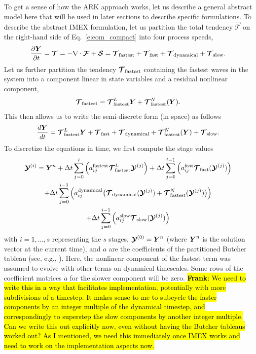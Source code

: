 \documentclass{article}
\begin{document}
To get a sense of how the ARK approach works, let us describe a general abstract model here that will be used in later sections to describe specific formulations. To describe the abstract IMEX formulation, let us partition the total tendency $\vec{\mathcal{T}}$ on the right-hand side of Eq.~\eqref{e:eom_compact} into four process speeds,
\[
\frac{\partial \boldsymbol{{Y}}}{\partial t} = \boldsymbol{{\mathcal{T}}} = - \nabla \cdot \boldsymbol{{\mathcal{F}}} + \boldsymbol{{\mathcal{S}}} = \boldsymbol{{\mathcal{T}}}_{\mathrm{fastest}} + \boldsymbol{{\mathcal{T}}}_{\mathrm{fast}} + \boldsymbol{{\mathcal{T}}}_{\mathrm{dynamical}} + \boldsymbol{{\mathcal{T}}}_{\mathrm{slow}}.
\]
Let us further partition the tendency $\boldsymbol{{\mathcal{T}}}_\mathrm{fastest}$ containing the fastest waves in the system into a component linear in state variables and a residual nonlinear component,
\[
\boldsymbol{{\mathcal{T}}}_\mathrm{fastest} =  \boldsymbol{{\mathcal{T}}}^L_\mathrm{fastest} \boldsymbol{{Y}} + \boldsymbol{{\mathcal{T}}}^N_\mathrm{fastest}(\boldsymbol{{Y}}).
\]
This then allows us to write the semi-discrete form (in space) as follows
\begin{equation}\label{eq:IMEX}
\frac{d \boldsymbol{{Y}}}{d t} =  \boldsymbol{{\mathcal{T}}}^L_\mathrm{fastest} \boldsymbol{{Y}} + \boldsymbol{{\mathcal{T}}}_\mathrm{fast} + 
\boldsymbol{{\mathcal{T}}}_\mathrm{dynamical} + \boldsymbol{{\mathcal{T}}}^N_\mathrm{fastest}(\boldsymbol{{Y}}) + \boldsymbol{{\mathcal{T}}}_\mathrm{slow}.
\end{equation}
To discretize the equations in time, we first compute the stage values
\begin{multline}\label{eq:IMEX/stages}
\boldsymbol{{\mathcal{Y}}}^{(i)}= \boldsymbol{{Y}}^n + \Delta t \sum_{j=0}^{i} \left( a^{\mathrm{fastest}}_{ij} \boldsymbol{{\mathcal{T}}}_{\mathrm{fastest}}^L \boldsymbol{{\mathcal{Y}}}^{(j)} \right) + \Delta t \sum_{j=0}^{i-1} \left( {a}^{\mathrm{fast}}_{ij} \boldsymbol{{\mathcal{T}}}_{\mathrm{fast}}(\boldsymbol{{\mathcal{Y}}}^{(j)}) \right)  \\
+  \Delta t \sum_{j=0}^{i-1} \left( {a}^{\mathrm{dynamical}}_{ij} \bigl(\boldsymbol{{\mathcal{T}}}_{\mathrm{dynamical}}(\boldsymbol{{\mathcal{Y}}}^{(j)}) + \boldsymbol{{\mathcal{T}}}^N_\mathrm{fastest}(\boldsymbol{{\mathcal{Y}}}^{(j)})\bigr)\right) \\
+ \Delta t \sum_{j=0}^{i-1} \left( {a}^{\mathrm{slow}}_{ij} \boldsymbol{{\mathcal{T}}}_{\mathrm{slow}}(\boldsymbol{{\mathcal{Y}}}^{(j)}) \right)
\end{multline}
with $i=1,\ldots,s$ representing the $s$ stages, $\boldsymbol{{\mathcal{Y}}}^{(0)}=\boldsymbol{{Y}}^n$ (where $\boldsymbol{{Y}}^n$ is the solution vector at the current time), and $a$ are the coefficients of the partitioned Butcher tableau (see, e.g., \citet{constantinescu:2007, constantinescu:2007}). Here, the nonlinear component of the fastest term was assumed to evolve with other terms on dynamical timescales. Some rows of the coefficient matrices $a$ for the slower component will be zero. \hl{\textbf{Frank}: We need to write this in a way that facilitates implementation, potentially with more subdivisions of a timestep. It makes sense to me to subcycle the faster components by an integer multiple of the dynamical timestep, and correspondingly to superstep the slow components by another integer multiple. Can we write this out explicitly now, even without having the Butcher tableaus worked out? As I mentioned, we need this immediately once IMEX works and need to work on the implementation aspects now.} 
\end{document}
